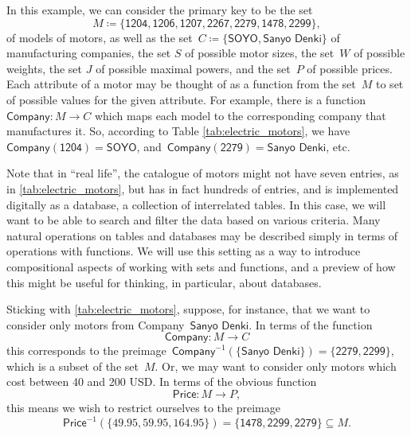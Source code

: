 In this example, we can consider the primary key to be the set
\begin{equation*}
M \coloneqq \{ \textsf{1204}, \textsf{1206}, \textsf{1207}, \textsf{2267}, \textsf{2279}, \textsf{1478}, \textsf{2299} \},
\end{equation*}
of models of motors, as well as the set~$C \coloneqq \{ \textsf{SOYO}, \textsf{Sanyo Denki}\}$ of manufacturing companies, the set $S$ of possible motor sizes, the set~$W$ of possible weights, the set $J$ of possible maximal powers, and the set~$P$ of possible prices. Each attribute of a motor may be thought of as a function from the set~$M$ to set of possible values for the given attribute. For example, there is a function~$\textsf{Company}\colon M \to C$ which maps each model to the corresponding company that manufactures it. So, according to Table \ref{tab:electric_motors}, we have ~$\textsf{Company}(\textsf{1204}) = \textsf{SOYO}$, and~$\textsf{Company}(\textsf{2279}) = \textsf{Sanyo Denki}$, etc.

Note that in ``real life'', the catalogue of motors might not have seven entries, as in \cref{tab:electric_motors}, but has in fact hundreds of entries, and is implemented digitally as a database,  a collection of interrelated tables. In this case, we will want to be able to search and filter the data based on various criteria. Many natural operations on tables and databases may be described simply in terms of operations with functions. We will use this setting as a way to introduce compositional aspects of working with sets and functions, and a preview of how this might be useful for thinking, in particular, about databases.

Sticking with \cref{tab:electric_motors}, suppose, for instance, that we want to consider only motors from Company~$\textsf{Sanyo Denki}$. In terms of the function
\begin{equation*}
\textsf{Company}\colon M \to C
\end{equation*}
this corresponds to the preimage~$\textsf{Company}^{-1}(\{ \textsf{Sanyo Denki} \}) = \{ \textsf{2279}, \textsf{2299}\}$, which is a subset of the set~$M$. Or, we may want to consider only motors which cost between 40 and 200 USD. In terms of the obvious function
\begin{equation*}
\textsf{Price}\colon M \to P,
\end{equation*}
this means we wish to restrict ourselves to the preimage
\begin{equation*}
\textsf{Price}^{-1}(\{ 49.95, 59.95, 164.95\}) = \{ \textsf{1478}, \textsf{2299}, \textsf{2279} \} \subseteq M.
\end{equation*}

